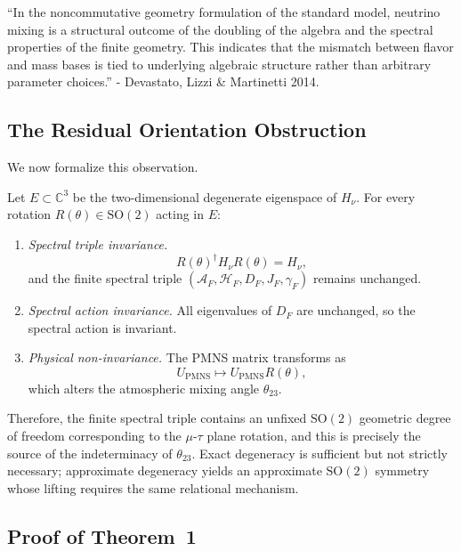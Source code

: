 ``In the noncommutative geometry formulation of the standard model, neutrino mixing is a structural outcome of the doubling of the algebra and the spectral properties of the finite geometry. This indicates that the mismatch between flavor and mass bases is tied to underlying algebraic structure rather than arbitrary parameter choices.'' - Devastato, Lizzi \& Martinetti 2014.

\subsection{The Residual Orientation Obstruction}

We now formalize this observation.

\begin{theorem}
Let $E\subset\mathbb C^3$ be the two-dimensional degenerate eigenspace of $H_\nu$. For every rotation $R(\theta)\in\mathrm{SO}(2)$ acting in $E$:

\begin{enumerate}
\item \emph{Spectral triple invariance.}
\[
R(\theta)^\dagger H_\nu R(\theta) = H_\nu,
\]
and the finite spectral triple $(\mathcal A_F,\mathcal H_F,D_F,J_F,\gamma_F)$ remains unchanged.
\item \emph{Spectral action invariance.}
All eigenvalues of $D_F$ are unchanged, so the spectral action is invariant.
\item \emph{Physical non-invariance.}
The PMNS matrix transforms as
\[
U_{\mathrm{PMNS}} \longmapsto U_{\mathrm{PMNS}} R(\theta),
\]
which alters the atmospheric mixing angle $\theta_{23}$.

\end{enumerate}
Therefore, the finite spectral triple contains an unfixed $\mathrm{SO}(2)$ geometric degree of freedom corresponding to the $\mu$-$\tau$ plane rotation, and this is precisely the source of the indeterminacy of $\theta_{23}$. Exact degeneracy is sufficient but not strictly necessary; approximate degeneracy yields an approximate $\mathrm{SO}(2)$ symmetry whose lifting requires the same relational mechanism.
\end{theorem}

\subsection[Proof of Theorem 1]{Proof of Theorem~1}

